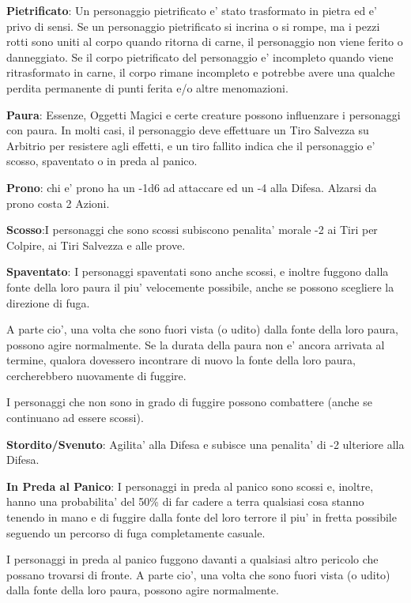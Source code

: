 \documentclass[a4paper,11pt,twoside,openany]{book}
\begin{document}
{\textbf{Pietrificato}: Un personaggio pietrificato e' stato trasformato in pietra ed e' privo di sensi. Se un personaggio pietrificato si incrina o si rompe, ma i pezzi rotti sono uniti al corpo quando ritorna di carne, il personaggio non viene ferito o danneggiato. Se il corpo pietrificato del personaggio e' incompleto quando viene ritrasformato in carne, il corpo rimane incompleto e potrebbe avere una qualche perdita permanente di punti ferita e/o altre menomazioni.

\textbf{Paura}: Essenze, Oggetti Magici e certe creature possono influenzare i personaggi con paura. In molti casi, il personaggio deve effettuare un Tiro Salvezza su Arbitrio per resistere agli effetti, e un tiro fallito indica che il personaggio e' scosso, spaventato o in preda al panico.

\textbf{Prono}: chi e' prono ha un -1d6 ad attaccare ed un -4 alla Difesa. Alzarsi da prono costa 2 Azioni.

\textbf{Scosso}:I personaggi che sono scossi subiscono penalita' morale -2 ai Tiri per Colpire, ai Tiri Salvezza e alle prove.

\textbf{Spaventato}: I personaggi spaventati sono anche scossi, e inoltre fuggono dalla fonte della loro paura il piu' velocemente possibile, anche se possono scegliere la direzione di fuga. 

A parte cio', una volta che sono fuori vista (o udito) dalla fonte della loro paura, possono agire normalmente. Se la durata della paura non e' ancora arrivata al termine, qualora dovessero incontrare di nuovo la fonte della loro paura, cercherebbero nuovamente di fuggire.

I personaggi che non sono in grado di fuggire possono combattere (anche se continuano ad essere scossi).

\textbf{Stordito/Svenuto}: Agilita' alla Difesa e subisce una penalita' di -2 ulteriore alla Difesa.

\textbf{In Preda al Panico}: I personaggi in preda al panico sono scossi e, inoltre, hanno una probabilita' del 50\% di far cadere a terra qualsiasi cosa stanno tenendo in mano e di fuggire dalla fonte del loro terrore il piu' in fretta possibile seguendo un percorso di fuga completamente casuale.

I personaggi in preda al panico fuggono davanti a qualsiasi altro pericolo che possano trovarsi di fronte. A parte cio', una volta che sono fuori vista (o udito) dalla fonte della loro paura, possono agire normalmente.

}
\end{document}
